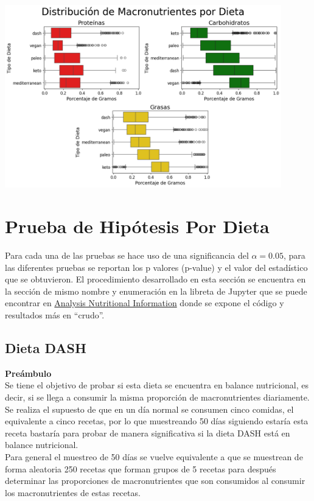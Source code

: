 \documentclass[12pt,a4paper]{article}
\begin{document}
            \begin{center}
                \includegraphics[width=0.90\textwidth]{Resources/2_03_plot_06.png}
            \end{center}

\newpage

\section{Prueba de Hipótesis Por Dieta}

    Para cada una de las pruebas se hace uso de una significancia del $\alpha = 0.05$, 
    para las diferentes pruebas se reportan los p valores (p-value) y el valor del 
    estadístico que se obtuvieron. El procedimiento desarrollado en esta sección se 
    encuentra en la sección de mismo nombre y enumeración en la libreta de Jupyter 
    que se puede encontrar en \href{https://github.com/alexisuaguilaru/Analysis_Nutritional_Information/blob/main/Documentation/AlexisAguilar_Reporte.ipynb}{Analysis Nutritional Information} 
    donde se expone el código y resultados más en ``crudo''.

    \subsection{Dieta DASH}
        \textbf{Preámbulo}\\
        { 
            Se tiene el objetivo de probar si esta dieta se encuentra 
            en balance nutricional, es decir, si se llega a consumir la 
            misma proporción de macronutrientes diariamente.\\

            Se realiza el supuesto de que en un día normal se consumen 
            cinco comidas, el equivalente a cinco recetas, por lo que 
            muestreando 50 días siguiendo estaría esta receta bastaría 
            para probar de manera significativa si la dieta DASH está en 
            balance nutricional.\\

            Para general el muestreo de 50 días se vuelve equivalente a 
            que se muestrean de forma aleatoria 250 recetas que forman 
            grupos de 5 recetas para después determinar las proporciones 
            de macronutrientes que son consumidos al consumir los macronutrientes 
            de estas recetas.\\
        }
\end{document}
